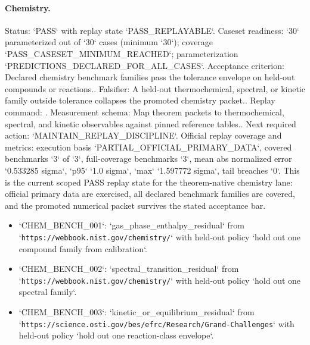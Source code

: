 \paragraph{Chemistry.}
Status: `PASS` with replay state `PASS\_REPLAYABLE`.
Caseset readiness: `30` parameterized out of `30` cases (minimum `30`); coverage `PASS\_CASESET\_MINIMUM\_REACHED`; parameterization `PREDICTIONS\_DECLARED\_FOR\_ALL\_CASES`.
Acceptance criterion: Declared chemistry benchmark families pass the tolerance envelope on held-out compounds or reactions..
Falsifier: A held-out thermochemical, spectral, or kinetic family outside tolerance collapses the promoted chemistry packet..
Replay command: .
Measurement schema: Map theorem packets to thermochemical, spectral, and kinetic observables against pinned reference tables..
Next required action: `MAINTAIN\_REPLAY\_DISCIPLINE`.
Official replay coverage and metrics: execution basis `PARTIAL\_OFFICIAL\_PRIMARY\_DATA`, covered benchmarks `3` of `3`, full-coverage benchmarks `3`, mean abs normalized error `0.533285 sigma`, `p95` `1.0 sigma`, `max` `1.597772 sigma`, tail breaches `0`.
This is the current scoped PASS replay state for the theorem-native chemistry
lane: official primary data are exercised, all declared benchmark families are
covered, and the promoted numerical packet survives the stated acceptance bar.
\begin{itemize}
\item `CHEM\_BENCH\_001`: `gas\_phase\_enthalpy\_residual` from `\texttt{https://webbook.nist.gov/chemistry/}` with held-out policy `hold out one compound family from calibration`.
\item `CHEM\_BENCH\_002`: `spectral\_transition\_residual` from `\texttt{https://webbook.nist.gov/chemistry/}` with held-out policy `hold out one spectral family`.
\item `CHEM\_BENCH\_003`: `kinetic\_or\_equilibrium\_residual` from `\texttt{https://science.osti.gov/bes/efrc/Research/Grand-Challenges}` with held-out policy `hold out one reaction-class envelope`.
\end{itemize}


